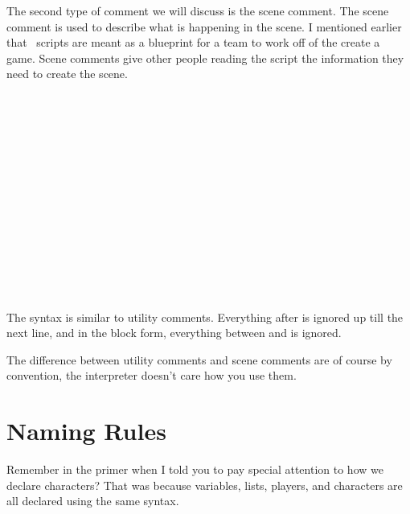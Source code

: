  The second type of comment we will discuss is the scene comment. The scene comment is used to describe what is happening in the scene.  I mentioned earlier that \SSquared\ scripts are meant as a blueprint for a team to work off of the create a game.  Scene comments give other people reading the script the information they need to create the scene.

\begin{SSCodeBox}
\scitea{} \\
 \\
 \\
 \\
\scitea{} \\
\scitea{} \\
\scitea{\{} \\
\scitea{;} \\
\scitea{\hspace*{4em}} \\
\scitea{\hspace*{4em}}
\scitea{=} \\
 \\
 \\
 \\
\scitea{\}}
\end{SSCodeBox}

The syntax is similar to utility comments.  Everything after \SSCode{/>} is ignored up till the next line, and in the block form, everything between  and  is ignored.

The difference between utility comments and scene comments are of course by convention, the interpreter doesn't care how you use them.


\section{Naming Rules}

Remember in the primer when I told you to pay special attention to how we declare characters?  That was because variables, lists, players, and characters are all declared using the same syntax.

